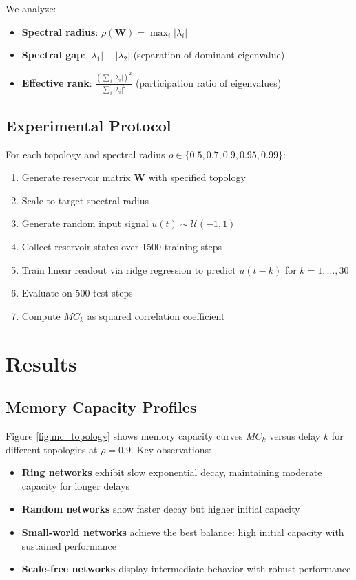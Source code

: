 \documentclass[11pt]{article}
\begin{document}
We analyze:
\begin{itemize}
\item \textbf{Spectral radius}: $\rho(\mathbf{W}) = \max_i |\lambda_i|$
\item \textbf{Spectral gap}: $|\lambda_1| - |\lambda_2|$ (separation of dominant eigenvalue)
\item \textbf{Effective rank}: $\frac{(\sum_i |\lambda_i|)^2}{\sum_i |\lambda_i|^2}$ (participation ratio of eigenvalues)
\end{itemize}

\subsection{Experimental Protocol}

For each topology and spectral radius $\rho \in \{0.5, 0.7, 0.9, 0.95, 0.99\}$:
\begin{enumerate}
\item Generate reservoir matrix $\mathbf{W}$ with specified topology
\item Scale to target spectral radius
\item Generate random input signal $u(t) \sim \mathcal{U}(-1,1)$
\item Collect reservoir states over 1500 training steps
\item Train linear readout via ridge regression to predict $u(t-k)$ for $k=1,\ldots,30$
\item Evaluate on 500 test steps
\item Compute $MC_k$ as squared correlation coefficient
\end{enumerate}

\section{Results}

\subsection{Memory Capacity Profiles}

Figure \ref{fig:mc_topology} shows memory capacity curves $MC_k$ versus delay $k$ for different topologies at $\rho=0.9$. Key observations:

\begin{itemize}
\item \textbf{Ring networks} exhibit slow exponential decay, maintaining moderate capacity for longer delays
\item \textbf{Random networks} show faster decay but higher initial capacity
\item \textbf{Small-world networks} achieve the best balance: high initial capacity with sustained performance
\item \textbf{Scale-free networks} display intermediate behavior with robust performance
\end{itemize}
\end{document}
